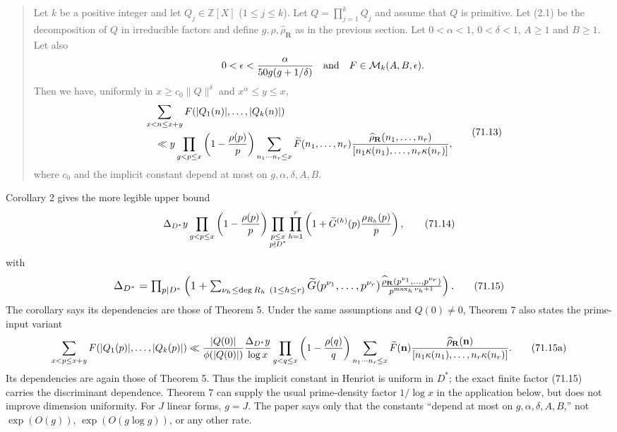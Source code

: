 \documentclass[10pt,reqno]{amsart}
\theoremstyle{definition}
\newcommand{\1}{\mathbf 1}
\begin{document}
\begin{quote}
Let $k$ be a positive integer and let $Q_j\in\mathbb Z[X]$
($1\leq j\leq k$).  Let $Q=\prod_{j=1}^kQ_j$ and assume that $Q$
is primitive.  Let (2.1) be the decomposition of $Q$ in irreducible
factors and define $g,\rho,\widehat\rho_{\mathbf R}$ as in the previous
section.  Let $0<\alpha<1$, $0<\delta<1$, $A\geq1$ and
$B\geq1$.  Let also
\[
0<\epsilon<{\alpha\over50g(g+1/\delta)}
\quad\hbox{and}\quad F\in\mathcal M_k(A,B,\epsilon).
\]
Then we have, uniformly in $x\geq c_0\|Q\|^\delta$ and
$x^\alpha\leq y\leq x$,
\begin{equation}
\begin{split}
&\sum_{x<n\leq x+y}F(|Q_1(n)|,\ldots,|Q_k(n)|)\\
&\quad\ll y\prod_{g<p\leq x}\left(1-{\rho(p)\over p}\right)
\sum_{n_1\cdots n_r\leq x}
\widetilde F(n_1,\ldots,n_r)
{\widehat\rho_{\mathbf R}(n_1,\ldots,n_r)
\over[n_1\kappa(n_1),\ldots,n_r\kappa(n_r)]},
\end{split}                                               \tag{71.13}
\end{equation}
where $c_0$ and the implicit constant depend at most on
$g,\alpha,\delta,A,B$.
\end{quote}

Corollary 2 gives the more legible upper bound
\begin{equation}
 \Delta_{D^*}y\prod_{g<p\leq x}\left(1-{\rho(p)\over p}\right)
 \prod_{\substack{p\leq x\\p\nmid D^*}}
 \prod_{h=1}^r\left(1+\widetilde G^{(h)}(p)
                      {\rho_{R_h}(p)\over p}\right),      \tag{71.14}
\end{equation}
with
\begin{equation}
\resizebox{\textwidth}{!}{$
 \Delta_{D^*}=\prod_{p\mid D^*}\left(1+
 \sum_{\nu_h\leq\deg R_h\ (1\leq h\leq r)}
 \widetilde G(p^{\nu_1},\ldots,p^{\nu_r})
 {\widehat\rho_{\mathbf R}(p^{\nu_1},\ldots,p^{\nu_r})
  \over p^{\max_h\nu_h+1}}\right).
$}                                                          \tag{71.15}
\end{equation}
The corollary says its dependencies are those of Theorem 5.  Under the
same assumptions and $Q(0)\ne0$, Theorem 7 also states the prime-input
variant
\begin{equation}
 \sum_{x<p\leq x+y}F(|Q_1(p)|,\ldots,|Q_k(p)|)
 \ll {|Q(0)|\over\phi(|Q(0)|)}{\Delta_{D^*}y\over\log x}
 \prod_{g<q\leq x}\left(1-{\rho(q)\over q}\right)
 \sum_{n_1\cdots n_r\leq x}\widetilde F(\mathbf n)
 {\widehat\rho_{\mathbf R}(\mathbf n)
  \over[n_1\kappa(n_1),\ldots,n_r\kappa(n_r)]}.          \tag{71.15a}
\end{equation}
Its dependencies are again those of Theorem 5.  Thus the implicit constant
in Henriot is uniform in $D^*$; the exact finite factor (71.15) carries the
discriminant dependence.  Theorem 7 can supply the usual prime-density
factor $1/\log x$ in the application below, but does not improve dimension
uniformity.  For $J$ linear forms, $g=J$.  The paper says only that the
constants ``depend at most on $g,\alpha,\delta,A,B$,'' not
$\exp(O(g))$, $\exp(O(g\log g))$, or any other rate.
\end{document}
